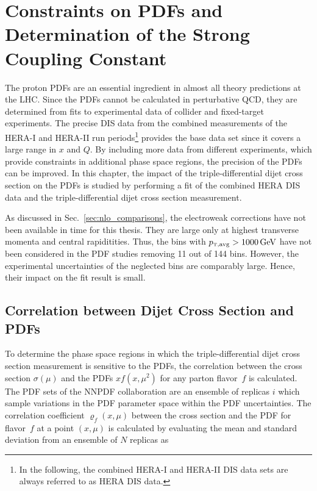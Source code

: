 
\chapter[Constraints on PDFs and Determination of the Strong Coupling
Constant]{Constraints on PDFs and Determination of the Strong Coupling Constant}
\label{sec:pdf_constraints}

The proton PDFs are an essential ingredient in almost all theory predictions at
the LHC. Since the PDFs cannot be calculated in perturbative QCD, they are
determined from fits to experimental data of collider and fixed-target
experiments. The precise DIS data from the combined measurements of the HERA-I
and HERA-II run periods\footnote{In the following, the combined HERA-I and
HERA-II DIS data sets are always referred to as HERA DIS data.} provides the
base data set since it covers a large range in $x$ and $Q$. By
including more data from different experiments, which provide constraints in
additional phase space regions, the precision of the PDFs can be improved. In
this chapter, the impact of the triple-differential dijet cross section on the
PDFs is studied by performing a fit of the combined HERA DIS data and the
triple-differential dijet cross section measurement.

As discussed in Sec.~\ref{sec:nlo_comparisons}, the electroweak corrections have
not been available in time for this thesis. They are large only at highest
transverse momenta and central rapiditities. Thus, the bins with $\ptavg >
\SI{1000}{\GeV}$ have not been considered in the PDF studies removing 11 out of 144
bins. However, the experimental uncertainties of the neglected bins are
comparably large. Hence, their impact on the fit result is small.

\section{Correlation between Dijet Cross Section and PDFs}
\label{sec:pdf_sensitivity}

To determine the phase space regions in which the triple-differential dijet
cross section measurement is sensitive to the PDFs, the correlation between the cross
section $\sigma(\mu)$ and the PDFs $xf(x,\mu^2)$ for any parton flavor~$f$ is
calculated. The PDF sets of the NNPDF collaboration are an ensemble of replicas
$i$ which sample variations in the PDF parameter space within the PDF
uncertainties. The correlation coefficient $\varrho_f(x,\mu)$ between the cross
section and the PDF for flavor~$f$ at a point $(x,\mu)$ is calculated by
evaluating the mean and standard deviation from an ensemble of $N$ replicas as

